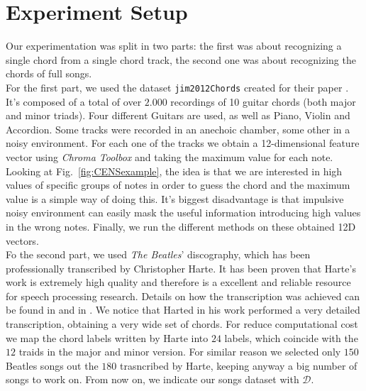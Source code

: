 \section{Experiment Setup}
\label{sec:setup}

Our experimentation was split in two parts: the first was about recognizing a single chord from a single chord track, the second one was about recognizing the chords of full songs.\\
%
For the first part, we used the dataset \texttt{jim2012Chords} \cite{jim2012Chords} created for their paper \cite{JimChordsPaper}. It's composed of a total of over $2.000$ recordings of 10 guitar chords (both major and minor triads). Four different Guitars are used, as well as Piano, Violin and Accordion. Some tracks were recorded in an anechoic chamber, some other in a noisy environment. For each one of the tracks we obtain a 12-dimensional feature vector using \textit{Chroma Toolbox} and taking the maximum value for each note. Looking at Fig.~\ref{fig:CENSexample}, the idea is that we are interested in high values of specific groups of notes in order to guess the chord and the maximum value is a simple way of doing this. It's biggest disadvantage is that impulsive noisy environment can easily mask the useful information introducing high values in the wrong notes. Finally, we run the different methods on these obtained 12D vectors.\\
%
Fo the second part, we used \textit{The Beatles}' discography, which has been professionally transcribed by Christopher Harte. It has been proven that Harte's work is extremely high quality and therefore is a excellent and reliable resource for speech processing research. Details on how the transcription was achieved can be found in \cite{HartePaper} and in \cite{HarteThesis}. We notice that Harted in his work performed a very detailed transcription, obtaining a very wide set of chords. For reduce computational cost we map the chord labels written by Harte into $24$ labels, which coincide with the $12$ traids in the major and minor version. For similar reason we selected only $150$ Beatles songs out the $180$ trasncribed by Harte, keeping anyway a big number of songs to work on. From now on, we indicate our songs dataset with $\mathcal{D}$. \\
%
